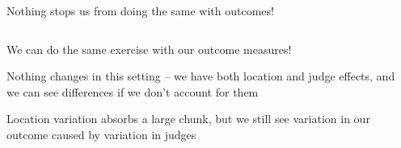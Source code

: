 \documentclass[notes,11pt, aspectratio=169]{beamer}
\newenvironment{wideitemize}{\itemize\addtolength{\itemsep}{10pt}}{\enditemize}
\begin{document}
\begin{frame}{Nothing stops us from doing the same with outcomes!}
    \begin{columns}[onlytextwidth, T] %
      \begin{column}{.5\textwidth}
        \begin{wideitemize}
        \item We can do the same exercise with our outcome measures!
        \item Nothing changes in this setting -- we have both location
          and judge effects, and we can see differences if we don't
          account for them
        \item Location variation absorbs a large chunk, but we still
          see variation in our outcome caused by variation in judges
        \end{wideitemize}
      \end{column}%
      \hfill%
      \begin{column}{.5\textwidth}

\end{column}
\end{columns}
\end{frame}
\end{document}
